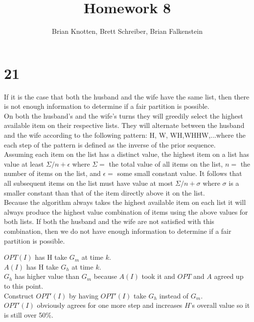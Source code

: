 \documentclass[letterpaper,notitlepage,twoside]{article}
\begin{document}
\title{Homework 8}
\author{Brian Knotten, Brett Schreiber, Brian Falkenstein}
\maketitle

\section*{21}
If it is the case that both the husband and the wife have the same list, then there is not enough information to determine if a fair partition is possible. \\
On both the husband's and the wife's turns they will greedily select the highest available item on their respective lists. They will alternate between the husband and the wife according to the following pattern: H, W, WH,WHHW,...where the each step of the pattern is defined as the inverse of the prior sequence. \\
Assuming each item on the list has a distinct value, the highest item on a list has value at least $\Sigma / n + \epsilon$ where $\Sigma =$ the total value of all items on the list, $n =$ the number of items on the list, and $\epsilon =$ some small constant value. It follows that all subsequent items on the list must have value at most $\Sigma / n + \sigma$ where $\sigma$ is a smaller constant than that of the item directly above it on the list. \\ 
Because the algorithm always takes the highest available item on each list it will always produce the highest value combination of items using the above values for both lists. If both the husband and the wife are not satisfied with this combination, then we do not have enough information to determine if a fair partition is possible. 

$OPT(I)$ has H take $G_m$ at time $k$.\\
$A(I)$ has H take $G_h$ at time $k$. \\
$G_h$ has higher value than $G_m$ because $A(I)$ took it and $OPT$ and $A$ agreed up to this point. \\
Construct $OPT'(I)$ by having $OPT'(I)$ take $G_h$ instead of $G_m$. \\
$OPT'(I)$ obviously agrees for one more step and increases $H$'s overall value so it is still over 50\%.
\end{document}
